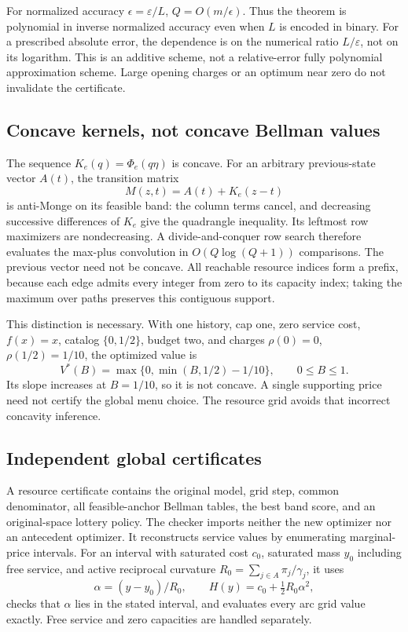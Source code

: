 \documentclass[11pt,letterpaper]{article}
\theoremstyle{definition}\newtheorem{remark}[theorem]{Remark}
\begin{document}
For normalized accuracy $\epsilon=\varepsilon/L$, $Q=O(m/\epsilon)$. Thus the theorem is polynomial in inverse normalized accuracy even when $L$ is encoded in binary. For a prescribed absolute error, the dependence is on the numerical ratio $L/\varepsilon$, not on its logarithm. This is an additive scheme, not a relative-error fully polynomial approximation scheme. Large opening charges or an optimum near zero do not invalidate the certificate.

\subsection{Concave kernels, not concave Bellman values}
The sequence $K_e(q)=\Phi_e(q\eta)$ is concave. For an arbitrary previous-state vector $A(t)$, the transition matrix
\[
 M(z,t)=A(t)+K_e(z-t)
\]
is anti-Monge on its feasible band: the column terms cancel, and decreasing successive differences of $K_e$ give the quadrangle inequality. Its leftmost row maximizers are nondecreasing. A divide-and-conquer row search therefore evaluates the max-plus convolution in $O(Q\log(Q+1))$ comparisons. The previous vector need not be concave. All reachable resource indices form a prefix, because each edge admits every integer from zero to its capacity index; taking the maximum over paths preserves this contiguous support.

This distinction is necessary. With one history, cap one, zero service cost, $f(x)=x$, catalog $\{0,1/2\}$, budget two, and charges $\rho(0)=0$, $\rho(1/2)=1/10$, the optimized value is
\[
 V^*(B)=\max\{0,\min(B,1/2)-1/10\},\qquad 0\leq B\leq1.
\]
Its slope increases at $B=1/10$, so it is not concave. A single supporting price need not certify the global menu choice. The resource grid avoids that incorrect concavity inference.

\subsection{Independent global certificates}
A resource certificate contains the original model, grid step, common denominator, all feasible-anchor Bellman tables, the best band score, and an original-space lottery policy. The checker imports neither the new optimizer nor an antecedent optimizer. It reconstructs service values by enumerating marginal-price intervals. For an interval with saturated cost $c_0$, saturated mass $y_0$ including free service, and active reciprocal curvature $R_0=\sum_{j\in A}\pi_j/\gamma_j$, it uses
\[
 \alpha=(y-y_0)/R_0,\qquad H(y)=c_0+\tfrac12R_0\alpha^2,
\]
checks that $\alpha$ lies in the stated interval, and evaluates every arc grid value exactly. Free service and zero capacities are handled separately.
\end{document}
